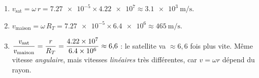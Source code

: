 \documentclass[11pt,a4paper]{article}
\begin{document}
\begin{corrige}
\begin{enumerate}[label=\alph*)]
  \item $v_{\text{sat}}=\omega\,r=\num{7.27e-5}\times\num{4.22e7}\approx\qty{3.1e3}{\metre\per\second}$.
  \item $v_{\text{maison}}=\omega\,R_T=\num{7.27e-5}\times\num{6.4e6}\approx\qty{465}{\metre\per\second}$.
  \item $\displaystyle \frac{v_{\text{sat}}}{v_{\text{maison}}}=\frac{r}{R_T}
        =\frac{\num{4.22e7}}{\num{6.4e6}}\approx 6{,}6$ : le satellite va $\approx 6{,}6$
        fois plus vite. Même vitesse \emph{angulaire}, mais vitesses \emph{linéaires}
        très différentes, car $v=\omega r$ dépend du rayon.
\end{enumerate}
\end{corrige}
\end{document}
